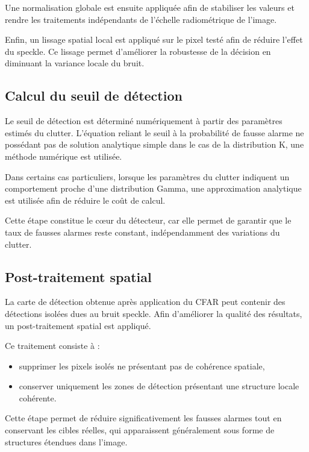 Une normalisation globale est ensuite appliquée afin de stabiliser les valeurs et rendre les traitements indépendants de l’échelle radiométrique de l’image.

Enfin, un lissage spatial local est appliqué sur le pixel testé afin de réduire l’effet du speckle. Ce lissage permet d’améliorer la robustesse de la décision en diminuant la variance locale du bruit.

\subsection{Calcul du seuil de détection}

Le seuil de détection est déterminé numériquement à partir des paramètres estimés du clutter. L’équation reliant le seuil à la probabilité de fausse alarme ne possédant pas de solution analytique simple dans le cas de la distribution K, une méthode numérique est utilisée.

Dans certains cas particuliers, lorsque les paramètres du clutter indiquent un comportement proche d’une distribution Gamma, une approximation analytique est utilisée afin de réduire le coût de calcul.

Cette étape constitue le cœur du détecteur, car elle permet de garantir que le taux de fausses alarmes reste constant, indépendamment des variations du clutter.

\subsection{Post-traitement spatial}

La carte de détection obtenue après application du CFAR peut contenir des détections isolées dues au bruit speckle. Afin d’améliorer la qualité des résultats, un post-traitement spatial est appliqué.

Ce traitement consiste à :

\begin{itemize}
    \item supprimer les pixels isolés ne présentant pas de cohérence spatiale,
    \item conserver uniquement les zones de détection présentant une structure locale cohérente.
\end{itemize}

Cette étape permet de réduire significativement les fausses alarmes tout en conservant les cibles réelles, qui apparaissent généralement sous forme de structures étendues dans l’image.

